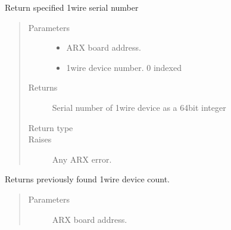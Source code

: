 \documentclass[letterpaper,10pt,english]{sphinxmanual}
\begin{document}
\begin{fulllineitems}
\begin{fulllineitems}
\end{fulllineitems}


\begin{fulllineitems}
\label{\detokenize{index:lwautils.lwa_arx.ARX.get_1wire_SN}}
Return specified 1wire serial number
\begin{quote}\begin{description}
\item[{Parameters}] \leavevmode\begin{itemize}
\item {} 
 \textendash{} ARX board address.

\item {} 
 \textendash{} 1wire device number. 0 indexed

\end{itemize}

\item[{Returns}] \leavevmode
Serial number of 1wire device as a 64bit integer

\item[{Return type}] \leavevmode
{}

\item[{Raises}] \leavevmode
{} \textendash{} Any ARX error.

\end{description}\end{quote}

\end{fulllineitems}


\begin{fulllineitems}
\label{\detokenize{index:lwautils.lwa_arx.ARX.get_1wire_count}}
Returns previously found 1wire device count.
\begin{quote}\begin{description}
\item[{Parameters}] \leavevmode
{} \textendash{} ARX board address.


\end{description}
\end{quote}
\end{fulllineitems}
\end{fulllineitems}
\end{document}
